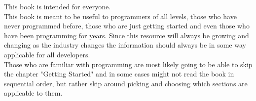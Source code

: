 This book is intended for everyone.
\newline
\\
This book is meant to be useful to programmers of all levels, those who have never programmed before, those who are just
getting started and even those who have been programming for years.
Since this resource will always be growing and changing as the industry changes the information should always be in some
way applicable for all developers.
\newline
\\
Those who are familiar with programming are most likely going to be able to skip the chapter "Getting Started" and in
some cases might not read the book in sequential order, but rather skip around picking and choosing which sections are
applicable to them.
